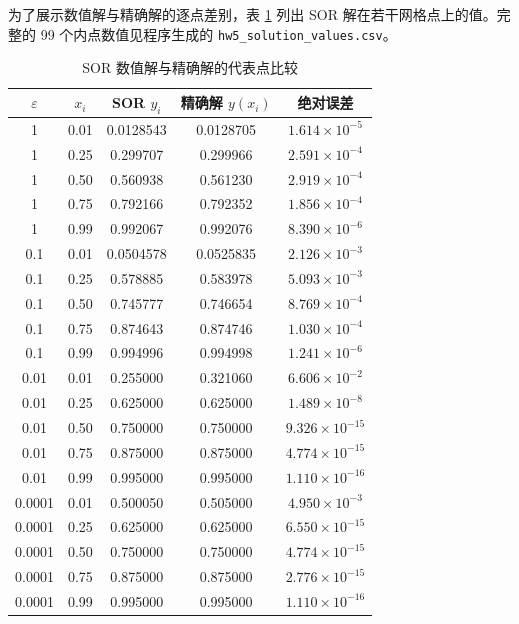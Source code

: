 \documentclass[a4paper,11pt]{article}
\begin{document}
为了展示数值解与精确解的逐点差别，表 \ref{tab:samples} 列出 SOR 解在若干网格点上的值。完整的 99 个内点数值见程序生成的 \verb|hw5_solution_values.csv|。

\begin{table}[H]
\centering
\small
\caption{SOR 数值解与精确解的代表点比较}
\label{tab:samples}
\begin{tabular}{ccccc}
\toprule
$\varepsilon$ & $x_i$ & SOR $y_i$ & 精确解 $y(x_i)$ & 绝对误差 \\
\midrule
1 & 0.01 & 0.0128543 & 0.0128705 & $1.614\times10^{-5}$ \\
1 & 0.25 & 0.299707 & 0.299966 & $2.591\times10^{-4}$ \\
1 & 0.50 & 0.560938 & 0.561230 & $2.919\times10^{-4}$ \\
1 & 0.75 & 0.792166 & 0.792352 & $1.856\times10^{-4}$ \\
1 & 0.99 & 0.992067 & 0.992076 & $8.390\times10^{-6}$ \\
\midrule
0.1 & 0.01 & 0.0504578 & 0.0525835 & $2.126\times10^{-3}$ \\
0.1 & 0.25 & 0.578885 & 0.583978 & $5.093\times10^{-3}$ \\
0.1 & 0.50 & 0.745777 & 0.746654 & $8.769\times10^{-4}$ \\
0.1 & 0.75 & 0.874643 & 0.874746 & $1.030\times10^{-4}$ \\
0.1 & 0.99 & 0.994996 & 0.994998 & $1.241\times10^{-6}$ \\
\midrule
0.01 & 0.01 & 0.255000 & 0.321060 & $6.606\times10^{-2}$ \\
0.01 & 0.25 & 0.625000 & 0.625000 & $1.489\times10^{-8}$ \\
0.01 & 0.50 & 0.750000 & 0.750000 & $9.326\times10^{-15}$ \\
0.01 & 0.75 & 0.875000 & 0.875000 & $4.774\times10^{-15}$ \\
0.01 & 0.99 & 0.995000 & 0.995000 & $1.110\times10^{-16}$ \\
\midrule
0.0001 & 0.01 & 0.500050 & 0.505000 & $4.950\times10^{-3}$ \\
0.0001 & 0.25 & 0.625000 & 0.625000 & $6.550\times10^{-15}$ \\
0.0001 & 0.50 & 0.750000 & 0.750000 & $4.774\times10^{-15}$ \\
0.0001 & 0.75 & 0.875000 & 0.875000 & $2.776\times10^{-15}$ \\
0.0001 & 0.99 & 0.995000 & 0.995000 & $1.110\times10^{-16}$ \\
\bottomrule
\end{tabular}
\end{table}
\end{document}
